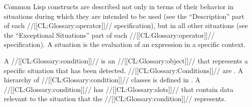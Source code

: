 

Common Lisp constructs are described not only in terms of their behavior in situations during which they are intended to be used (see the ``Description'' part of each //[[CL:Glossary:operator]]// specification), but in all other situations (see the ``Exceptional Situations'' part of each //[[CL:Glossary:operator]]// specification).
  A situation is the evaluation of an expression in a specific context.

A //[[CL:Glossary:condition]]// is an //[[CL:Glossary:object]]// that represents a specific situation that has been detected.   //[[CL:Glossary:Conditions]]// are . A hierarchy of //[[CL:Glossary:condition]]// classes is defined in \clisp.   A //[[CL:Glossary:condition]]// has //[[CL:Glossary:slots]]// that contain data  relevant to the situation that the //[[CL:Glossary:condition]]// represents.

